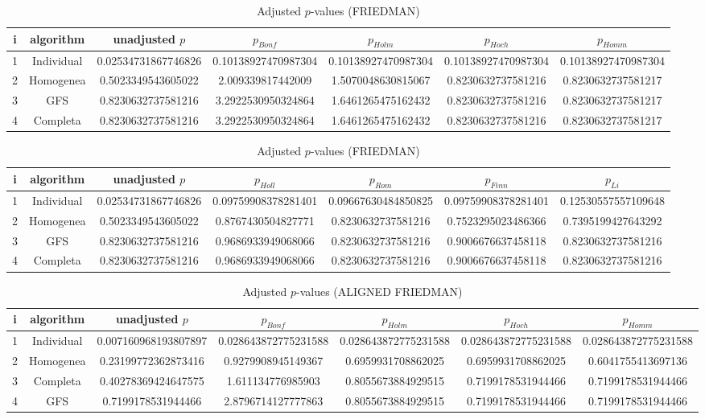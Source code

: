 \documentclass[a4paper,10pt]{article}
\begin{document}
\begin{landscape}
\begin{table}[!htp]
\centering\scriptsize
\caption{Adjusted $p$-values (FRIEDMAN)}
\begin{tabular}{ccccccc}
i&algorithm&unadjusted $p$&$p_{Bonf}$&$p_{Holm}$&$p_{Hoch}$&$p_{Homm}$\\
\hline
1&Individual&0.02534731867746826&0.10138927470987304&0.10138927470987304&0.10138927470987304&0.10138927470987304\\
2&Homogenea&0.5023349543605022&2.009339817442009&1.5070048630815067&0.8230632737581216&0.8230632737581217\\
3&GFS&0.8230632737581216&3.2922530950324864&1.6461265475162432&0.8230632737581216&0.8230632737581217\\
4&Completa&0.8230632737581216&3.2922530950324864&1.6461265475162432&0.8230632737581216&0.8230632737581217\\
\hline
\end{tabular}
\end{table}

\begin{table}[!htp]
\centering\scriptsize
\caption{Adjusted $p$-values (FRIEDMAN)}
\begin{tabular}{ccccccc}
i&algorithm&unadjusted $p$&$p_{Holl}$&$p_{Rom}$&$p_{Finn}$&$p_{Li}$\\
\hline
1&Individual&0.02534731867746826&0.09759908378281401&0.09667630484850825&0.09759908378281401&0.12530557557109648\\
2&Homogenea&0.5023349543605022&0.8767430504827771&0.8230632737581216&0.7523295023486366&0.7395199427643292\\
3&GFS&0.8230632737581216&0.9686933949068066&0.8230632737581216&0.9006676637458118&0.8230632737581216\\
4&Completa&0.8230632737581216&0.9686933949068066&0.8230632737581216&0.9006676637458118&0.8230632737581216\\
\hline
\end{tabular}
\end{table}


\newpage

\begin{table}[!htp]
\centering\scriptsize
\caption{Adjusted $p$-values (ALIGNED FRIEDMAN)}
\begin{tabular}{ccccccc}
i&algorithm&unadjusted $p$&$p_{Bonf}$&$p_{Holm}$&$p_{Hoch}$&$p_{Homm}$\\
\hline
1&Individual&0.007160968193807897&0.028643872775231588&0.028643872775231588&0.028643872775231588&0.028643872775231588\\
2&Homogenea&0.23199772362873416&0.9279908945149367&0.6959931708862025&0.6959931708862025&0.6041755413697136\\
3&Completa&0.40278369424647575&1.611134776985903&0.8055673884929515&0.7199178531944466&0.7199178531944466\\
4&GFS&0.7199178531944466&2.8796714127777863&0.8055673884929515&0.7199178531944466&0.7199178531944466\\
\hline
\end{tabular}
\end{table}


\end{landscape}
\end{document}
